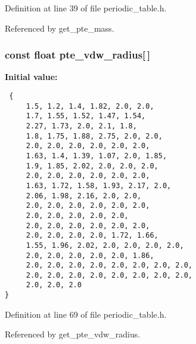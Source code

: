 Definition at line 39 of file periodic\_\-table.h.

Referenced by get\_\-pte\_\-mass.
\subsubsection{\setlength{\rightskip}{0pt plus 5cm}const float pte\_\-vdw\_\-radius[$\,$]\hspace{0.3cm}{\tt  [static]}}\label{periodic__table_8h_a3}


{\bf Initial value:}

\footnotesize\begin{verbatim} { 
     1.5, 1.2, 1.4, 1.82, 2.0, 2.0,  
     1.7, 1.55, 1.52, 1.47, 1.54, 
     2.27, 1.73, 2.0, 2.1, 1.8,
     1.8, 1.75, 1.88, 2.75, 2.0, 2.0,
     2.0, 2.0, 2.0, 2.0, 2.0, 2.0,
     1.63, 1.4, 1.39, 1.07, 2.0, 1.85,
     1.9, 1.85, 2.02, 2.0, 2.0, 2.0, 
     2.0, 2.0, 2.0, 2.0, 2.0, 2.0,
     1.63, 1.72, 1.58, 1.93, 2.17, 2.0, 
     2.06, 1.98, 2.16, 2.0, 2.0,
     2.0, 2.0, 2.0, 2.0, 2.0, 2.0,
     2.0, 2.0, 2.0, 2.0, 2.0,
     2.0, 2.0, 2.0, 2.0, 2.0, 2.0,
     2.0, 2.0, 2.0, 2.0, 1.72, 1.66,
     1.55, 1.96, 2.02, 2.0, 2.0, 2.0, 2.0,
     2.0, 2.0, 2.0, 2.0, 2.0, 1.86,
     2.0, 2.0, 2.0, 2.0, 2.0, 2.0, 2.0, 2.0,
     2.0, 2.0, 2.0, 2.0, 2.0, 2.0, 2.0, 2.0,
     2.0, 2.0, 2.0
}\end{verbatim}\normalsize 


Definition at line 69 of file periodic\_\-table.h.

Referenced by get\_\-pte\_\-vdw\_\-radius.